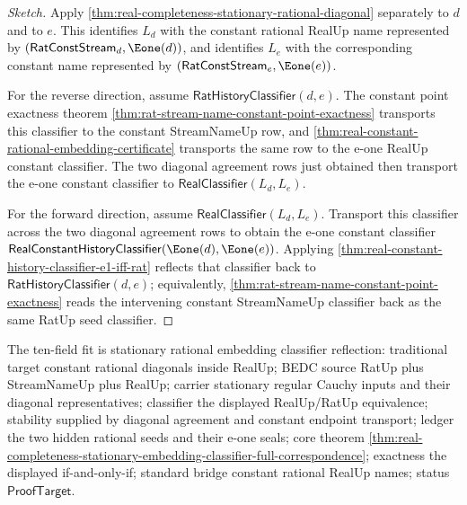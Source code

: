 \begin{proof}[Sketch]
Apply
\autoref{thm:real-completeness-stationary-rational-diagonal} separately to
$d$ and to $e$. This identifies $L_d$ with the constant rational RealUp name
represented by $(\mathsf{RatConstStream}_d,\Eone(d))$, and identifies $L_e$
with the corresponding constant name represented by
$(\mathsf{RatConstStream}_e,\Eone(e))$.

For the reverse direction, assume
$\mathsf{RatHistoryClassifier}(d,e)$. The constant point exactness theorem
\autoref{thm:rat-stream-name-constant-point-exactness} transports this
classifier to the constant StreamNameUp row, and
\autoref{thm:real-constant-rational-embedding-certificate} transports the
same row to the e-one RealUp constant classifier. The two diagonal agreement
rows just obtained then transport the e-one constant classifier to
$\mathsf{RealClassifier}(L_d,L_e)$.

For the forward direction, assume $\mathsf{RealClassifier}(L_d,L_e)$. Transport
this classifier across the two diagonal agreement rows to obtain the e-one
constant classifier
$\mathsf{RealConstantHistoryClassifier}(\Eone(d),\Eone(e))$. Applying
\autoref{thm:real-constant-history-classifier-e1-iff-rat} reflects that
classifier back to $\mathsf{RatHistoryClassifier}(d,e)$; equivalently,
\autoref{thm:rat-stream-name-constant-point-exactness} reads the intervening
constant StreamNameUp classifier back as the same RatUp seed classifier.
\end{proof}

The ten-field fit is stationary rational embedding classifier reflection:
traditional target constant rational diagonals inside RealUp; BEDC source
RatUp plus StreamNameUp plus RealUp; carrier stationary regular Cauchy inputs
and their diagonal representatives; classifier the displayed RealUp/RatUp
equivalence; stability supplied by diagonal agreement and constant endpoint
transport; ledger the two hidden rational seeds and their e-one seals; core
theorem
\autoref{thm:real-completeness-stationary-embedding-classifier-full-correspondence};
exactness the displayed if-and-only-if; standard bridge constant rational
RealUp names; status $\mathsf{ProofTarget}$.

